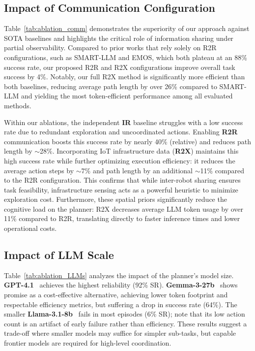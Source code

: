 \subsection{Impact of Communication Configuration}
Table~\ref{tab:ablation_comm} demonstrates the superiority of our approach against SOTA baselines and highlights the critical role of information sharing under partial observability. Compared to prior works that rely solely on R2R configurations, such as SMART-LLM and EMOS, which both plateau at an 88\% success rate, our proposed R2R and R2X configurations improve overall task success by 4\%. Notably, our full R2X method is significantly more efficient than both baselines, reducing average path length by over 26\% compared to SMART-LLM and yielding the most token-efficient performance among all evaluated methods.

Within our ablations, the independent \textbf{IR} baseline struggles with a low success rate due to redundant exploration and uncoordinated actions. Enabling \textbf{R2R} communication boosts this success rate by nearly 40\% (relative) and reduces path length by $\sim$28\%. Incorporating IoT infrastructure data (\textbf{R2X}) maintains this high success rate while further optimizing execution efficiency: it reduces the average action steps by $\sim$7\% and path length by an additional $\sim$11\% compared to the R2R configuration. This confirms that while inter-robot sharing ensures task feasibility, infrastructure sensing acts as a powerful heuristic to minimize exploration cost. Furthermore, these spatial priors significantly reduce the cognitive load on the planner: R2X decreases average LLM token usage by over 11\% compared to R2R, translating directly to faster inference times and lower operational costs.


\subsection{Impact of LLM Scale}
Table~\ref{tab:ablation_LLMs} analyzes the impact of the planner's model size. \textbf{GPT-4.1}~\cite{achiam2023gpt} achieves the highest reliability (92\% SR). \textbf{Gemma-3-27b}~\cite{team2025gemma} shows promise as a cost-effective alternative, achieving lower token footprint and respectable efficiency metrics, but suffering a drop in success rate (64\%). The smaller \textbf{Llama-3.1-8b}~\cite{dubey2024llama} fails in most episodes (6\% SR); note that its low action count is an artifact of early failure rather than efficiency. These results suggest a trade-off where smaller models may suffice for simpler sub-tasks, but capable frontier models are required for high-level coordination.

